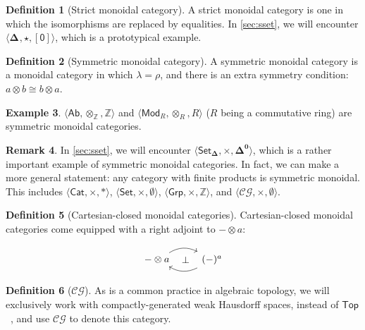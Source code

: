 \documentclass[10pt]{amsart}
\newcommand{\8}{\ensuremath{\infty}}
\newcommand{\0}{\ensuremath{\overset{\rightarrow}{0}}}
\newcommand{\1}{\ensuremath{\mathbf{1}}}
\newcommand{\Set}{\ensuremath{\mathsf{Set}}}
\newcommand{\Grp}{\ensuremath{\mathsf{Grp}}}
\newcommand{\Ab}{\ensuremath{\mathsf{Ab}}}
\newcommand{\Mod}{\ensuremath{\mathsf{Mod}}}
\newcommand{\Cat}{\ensuremath{\mathsf{Cat}}}
\newcommand{\CG}{\ensuremath{\mathscr{CG}}}
\newcommand{\langrang}[1]{\ensuremath{\langle {#1} \rangle}}
\newcommand{\Simplex}[1]{\ensuremath{\boldsymbol{\Delta^{#1}}}}
\newcommand{\SSet}{\ensuremath{\mathsf{Set}_{\boldsymbol{\Delta}}}}
\newcommand{\sq}[1]{\ensuremath{\mathsf{[#1]}}}
\theoremstyle{definition}
\newtheorem{definition}{Definition}[section]
\newtheorem{remark}[definition]{Remark}
\newtheorem{example}[definition]{Example}
\numberwithin{definition}{subsection}
\numberwithin{definition}{section}
\begin{document}
\begin{definition}[Strict monoidal category]
  A strict monoidal category is one in which the isomorphisms are replaced by equalities. In  \ref{sec:sset}, we will encounter \langrang{\Simplex{}, \star, \sq{0}}, which is a prototypical example.
\end{definition}

\begin{definition}[Symmetric monoidal category]
  A symmetric monoidal category is a monoidal category in which $\lambda = \rho$, and there is an extra symmetry condition: $a \otimes b \cong b \otimes a$.
\end{definition}

\begin{example}
  $\langrang{\Ab, \otimes_\mathbb{Z}, \mathbb{Z}}$ and $\langrang{\Mod_R, \otimes_R, R}$ ($R$ being a commutative ring) are symmetric monoidal categories.
\end{example}

\begin{remark}
  In \ref{sec:sset}, we will encounter \langrang{\SSet, \times, \Simplex{0}}, which is a rather important example of symmetric monoidal categories. In fact, we can make a more general statement: any category with finite products is symmetric monoidal. This includes \langrang{\Cat, \times, *}, \langrang{\Set, \times, \emptyset}, \langrang{\Grp, \times, \mathbb{Z}}, and \langrang{\CG, \times, \emptyset}.
\end{remark}

\begin{definition}[Cartesian-closed monoidal categories]
  Cartesian-closed monoidal categories come equipped with a right adjoint to $- \otimes a$:

  \begin{equation*}
    \begin{tikzcd}
      - \otimes a \arrow[r, bend left] \arrow[r, phantom, "\bot" description] & (-)^a \arrow[l, bend left]
    \end{tikzcd}
  \end{equation*}
\end{definition}

\begin{definition}[\CG]
  As is a common practice in algebraic topology, we will exclusively work with compactly-generated weak Hausdorff spaces, instead of $\mathsf{Top}$~\cite{Strickland09}, and use $\CG$ to denote this category.
\end{definition}
\end{document}
